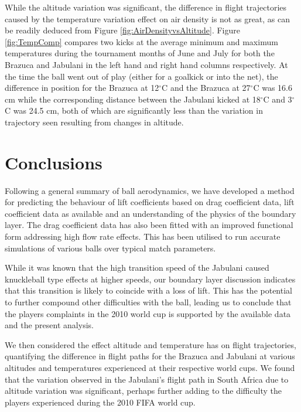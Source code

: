 \documentclass[a4paper]{article}
\begin{document}
While the altitude variation was significant, the difference in flight trajectories caused by the temperature variation effect on air density is not as great, as can be readily deduced from Figure \ref{fig:AirDensityvsAltitude}.  Figure \ref{fig:TempComp} compares two kicks at the average minimum and maximum temperatures during the tournament months of June and July for both the Brazuca and Jabulani in the left hand and right hand columns respectively.  At the time the ball went out of play (either for a goalkick or into the net), the difference in position for the Brazuca at 12$^{\circ}$C and the Brazuca at 27$^{\circ}$C was 16.6 cm while the corresponding distance between the Jabulani kicked at 18$^{\circ}$C and 3$^{\circ}$C was 24.5 cm, both of which are significantly less than the variation in trajectory seen resulting from changes in altitude.  

%
\section{Conclusions}
\label{sect:Conclusions}
Following a general summary of ball aerodynamics, we have developed a method for predicting the behaviour of lift coefficients based on drag coefficient data, lift coefficient data as available and an understanding of the physics of the boundary layer.  The drag coefficient data has also been fitted with an improved functional form addressing high flow rate effects.  This has been utilised to run accurate simulations of various balls over typical match parameters.

While it was known that the high transition speed of the Jabulani caused knuckleball type effects at higher speeds, our boundary layer discussion indicates that this transition is likely to coincide with a loss of lift.  This has the potential to further compound other difficulties with the ball, leading us to conclude that the players complaints in the 2010 world cup is supported by the available data and the present analysis.

We then considered the effect altitude and temperature has on flight trajectories, quantifying the difference in flight paths for the Brazuca and Jabulani at various altitudes and temperatures experienced at their respective world cups.  We found that the variation observed in the Jabulani's flight path in South Africa due to altitude variation was significant, perhaps further adding to the difficulty the players experienced during the 2010 FIFA world cup.
\end{document}
